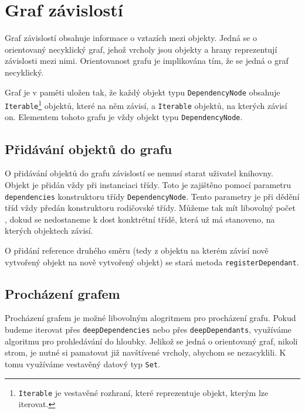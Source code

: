 \chapter{Graf závislostí}
\label{chap:dependency-graph}

Graf závislostí obsahuje informace o vztazích mezi  objekty.
Jedná se o orientovaný necyklický graf\cite{wikipedia:directed-graph}, jehož vrcholy jsou objekty a hrany reprezentují závislosti mezi nimi\cite{geometryjs:wiki:dependency-graph}.
Orientovanost grafu je implikována tím, že se jedná o graf necyklický.

Graf je v paměti uložen tak, že každý objekt typu \texttt{DependencyNode} obsahuje \texttt{Iterable}\footnote{\texttt{Iterable} je vestavěné rozhraní, které reprezentuje objekt, kterým lze iterovat.} objektů, které na něm závisí, a \texttt{Iterable} objektů, na kterých závisí on\cite[line 17, 21]{geometryjs:source:interfaces:dependencyNode.ts}.
Elementem tohoto grafu je vždy objekt typu \texttt{DependencyNode}.

\section[Přidávání objektů]{Přidávání objektů do grafu}
\label{sec:adding-objects-to-graph}

O přidávání objektů do grafu závislostí se nemusí starat uživatel knihovny.
Objekt je přidán vždy při instanciaci třídy.
Toto je zajištěno pomocí parametru \texttt{dependencies} konstruktoru třídy \texttt{DependencyNode}\cite[line 13-17]{geometryjs:source:geometryObjects:dependencyNode.ts}.
Tento parametry je při dědění tříd vždy předán konstruktoru rodičovské třídy. 
Můžeme tak mít libovolný počet , dokud se nedostaneme k dost konktrétní třídě, která už má stanoveno, na kterých objektech závisí.

O přidání reference druhého směru (tedy z objektu na kterém závisí nově vytvořený objekt na nově vytvořený objekt) se stará metoda \texttt{registerDependant}\cite[line 32]{geometryjs:source:interfaces:dependencyNode.ts}.

\section[Procházení]{Procházení grafem}
\label{sec:traversing-the-graph}

Procházení grafem je možné libovolným alogritmem pro procházení grafu.
Pokud budeme iterovat přes \texttt{deepDependencies}\cite[line 17]{geometryjs:source:interfaces:dependencyNode.ts} nebo přes \texttt{deepDependants}\cite[line 21]{geometryjs:source:interfaces:dependencyNode.ts}, využíváme algoritmu pro prohledávání do hloubky\cite{wikipedia:depth-first-search}.
Jelikož se jedná o orientovaný graf, nikoli strom, je nutné si pamatovat již navštívené vrcholy, abychom se nezacyklili.
K tomu využíváme vestavěný datový typ \texttt{Set}.

